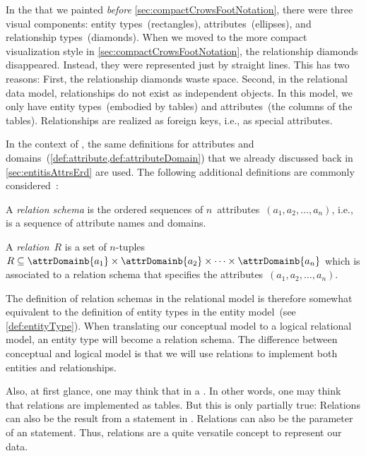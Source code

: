 %
\label{sec:relationalModel}%
%
In the  that we painted \emph{before} \cref{sec:compactCrowsFootNotation}, there were three visual components:
entity types~(rectangles), attributes~(ellipses), and relationship types~(diamonds).
When we moved to the more compact visualization style in \cref{sec:compactCrowsFootNotation}, the relationship diamonds disappeared.
Instead, they were represented just by straight lines.
This has two reasons:
First, the relationship diamonds waste space.
Second, in the relational data model, relationships do not exist as independent objects.
In this model, we only have entity types~(embodied by tables) and attributes~(the columns of the tables).
Relationships are realized as foreign keys, i.e., as special attributes.

In the context of , the same definitions for attributes and domains~(\cref{def:attribute,def:attributeDomain}) that we already discussed back in \cref{sec:entitisAttrsErd} are used.
The following additional definitions are commonly considered~\cite{C1970ARMODFLSDB}:%
%
\begin{definition}%
\sloppy%
A \emph{relation schema} is the ordered sequences of $n$~attributes~$(a_1, a_2, \dots, a_n)$, i.e., is a sequence of attribute names and domains.%
\end{definition}%
\fussy%
%
\begin{definition}[Relation]%
\label{def:rdb:relation}%
A \emph{relation}~$R$ is a set of $n$\nobreakdashes-tuples $R\subseteq\attrDomainb{a_1}\times\attrDomainb{a_2}\times\dots\times\attrDomainb{a_n}$ which is associated to a relation schema that specifies the attributes~$(a_1, a_2, \dots, a_n)$.%
\end{definition}%
%
The definition of relation schemas in the relational model is therefore somewhat equivalent to the definition of entity types in the entity model~(see \cref{def:entityType}).
When translating our conceptual model to a logical relational model, an entity type will become a relation schema.
The difference between conceptual and logical model is that we will use relations to implement both entities and relationships.

Also, at first glance, one may think that  in a \db.
In other words, one may think that relations are implemented as tables.
But this is only partially true:
Relations can also be the result from a  statement in \sql.
Relations can also be the parameter of an  statement.
Thus, relations are a quite versatile concept to represent our data.

